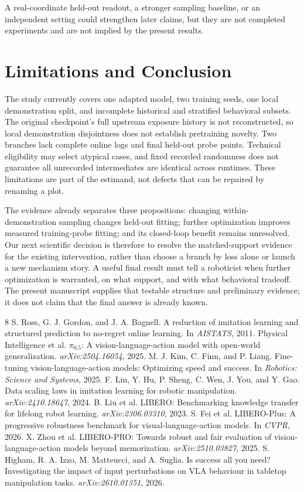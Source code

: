 \documentclass[conference]{IEEEtran}
\begin{document}
A real-coordinate held-out readout, a stronger sampling baseline, or an independent setting could strengthen later claims, but they are not completed experiments and are not implied by the present results.

\section{Limitations and Conclusion}
The study currently covers one adapted model, two training seeds, one local demonstration split, and incomplete historical and stratified behavioral subsets. The original checkpoint's full upstream exposure history is not reconstructed, so local demonstration disjointness does not establish pretraining novelty. Two branches lack complete online logs and final held-out probe points. Technical eligibility may select atypical cases, and fixed recorded randomness does not guarantee all unrecorded intermediates are identical across runtimes. These limitations are part of the estimand, not defects that can be repaired by renaming a plot.

The evidence already separates three propositions: changing within-demonstration sampling changes held-out fitting; further optimization improves measured training-probe fitting; and its closed-loop benefit remains unresolved. Our next scientific decision is therefore to resolve the matched-support evidence for the existing intervention, rather than choose a branch by loss alone or launch a new mechanism story. A useful final result must tell a roboticist when further optimization is warranted, on what support, and with what behavioral tradeoff. The present manuscript supplies that testable structure and preliminary evidence; it does not claim that the final answer is already known.

\clearpage

\begin{thebibliography}{8}
 S. Ross, G. J. Gordon, and J. A. Bagnell. A reduction of imitation learning and structured prediction to no-regret online learning. In \emph{AISTATS}, 2011.
 Physical Intelligence et al. $\pi_{0.5}$: A vision-language-action model with open-world generalization. \emph{arXiv:2504.16054}, 2025.
 M. J. Kim, C. Finn, and P. Liang. Fine-tuning vision-language-action models: Optimizing speed and success. In \emph{Robotics: Science and Systems}, 2025.
 F. Lin, Y. Hu, P. Sheng, C. Wen, J. You, and Y. Gao. Data scaling laws in imitation learning for robotic manipulation. \emph{arXiv:2410.18647}, 2024.
 B. Liu et al. LIBERO: Benchmarking knowledge transfer for lifelong robot learning. \emph{arXiv:2306.03310}, 2023.
 S. Fei et al. LIBERO-Plus: A progressive robustness benchmark for visual-language-action models. In \emph{CVPR}, 2026.
 X. Zhou et al. LIBERO-PRO: Towards robust and fair evaluation of vision-language-action models beyond memorization. \emph{arXiv:2510.03827}, 2025.
 S. Higham, R. A. Izzo, M. Matteucci, and A. Suglia. Is success all you need? Investigating the impact of input perturbations on VLA behaviour in tabletop manipulation tasks. \emph{arXiv:2610.01351}, 2026.
\end{thebibliography}
\end{document}

